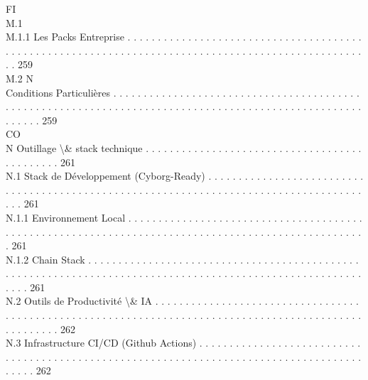 \vspace{0.5em}
\vspace{0.5em}
\vspace{0.5em}
FI\\
M.1\\
M.1.1               Les Packs Entreprise . . . . . . . . . . . . . . . . . . . . . . . . . . . . . . . . . . . . . . . . . . . . . . . . . . . . . . . . . . . . . . . . . . . . . . . . . . . . . . . . . . . . . . . . . . . . . . . . . . . . 259\\
M.2                                                                           N\\
Conditions Particulières . . . . . . . . . . . . . . . . . . . . . . . . . . . . . . . . . . . . . . . . . . . . . . . . . . . . . . . . . . . . . . . . . . . . . . . . . . . . . . . . . . . . . . . . . . . . . . . . . . . . . . . . . . 259\\
CO\\
N     Outillage \textbackslash{}& stack technique . . . . . . . . . . . . . . . . . . . . . . . . . . . . . . . . . . . . . . . . . . . . . 261\\
N.1     Stack de Développement (Cyborg-Ready) . . . . . . . . . . . . . . . . . . . . . . . . . . . . . . . . . . . . . . . . . . . . . . . . . . . . . . . . . . . . . . . . . . . . . . . . . . . . . . . . . . . . . . . . 261\\
N.1.1               Environnement Local . . . . . . . . . . . . . . . . . . . . . . . . . . . . . . . . . . . . . . . . . . . . . . . . . . . . . . . . . . . . . . . . . . . . . . . . . . . . . . . . . . . . . . . . . . . . . . . . . . . 261\\
N.1.2               Chain Stack . . . . . . . . . . . . . . . . . . . . . . . . . . . . . . . . . . . . . . . . . . . . . . . . . . . . . . . . . . . . . . . . . . . . . . . . . . . . . . . . . . . . . . . . . . . . . . . . . . . . . . . . . . . . 261\\
N.2     Outils de Productivité \textbackslash{}& IA . . . . . . . . . . . . . . . . . . . . . . . . . . . . . . . . . . . . . . . . . . . . . . . . . . . . . . . . . . . . . . . . . . . . . . . . . . . . . . . . . . . . . . . . . . . . . . . . . . . . . . 262\\
N.3     Infrastructure CI/CD (Github Actions) . . . . . . . . . . . . . . . . . . . . . . . . . . . . . . . . . . . . . . . . . . . . . . . . . . . . . . . . . . . . . . . . . . . . . . . . . . . . . . . . . . . . . . . . . . . 262\\
